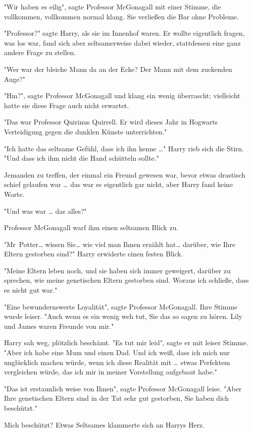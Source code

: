 {"Wir haben es eilig", sagte Professor McGonagall mit einer Stimme, die vollkommen, vollkommen normal klang. Sie verließen die Bar ohne Probleme.

"Professor?" sagte Harry, als sie im Innenhof waren. Er wollte eigentlich fragen, was los war, fand sich aber seltsamerweise dabei wieder, stattdessen eine ganz andere Frage zu stellen.

"Wer war der bleiche Mann da an der Ecke? Der Mann mit dem zuckenden Auge?"

"Hm?", sagte Professor McGonagall und klang ein wenig überrascht; vielleicht hatte sie diese Frage auch nicht erwartet.

"Das war Professor Quirinus Quirrell. Er wird dieses Jahr in Hogwarts Verteidigung gegen die dunklen Künste unterrichten."

"Ich hatte das seltsame Gefühl, dass ich ihn kenne …" Harry rieb sich die Stirn. "Und dass ich ihm nicht die Hand schütteln sollte."

Jemanden zu treffen, der einmal ein Freund gewesen war, bevor etwas drastisch schief gelaufen war … das war es eigentlich gar nicht, aber Harry fand keine Worte.

"Und was war … das alles?"

Professor McGonagall warf ihm einen seltsamen Blick zu.

"Mr~Potter… wissen Sie… wie viel man Ihnen erzählt hat… darüber, wie Ihre Eltern gestorben sind?" Harry erwiderte einen festen Blick.

"Meine Eltern leben noch, und sie haben sich immer geweigert, darüber zu sprechen, wie meine genetischen Eltern gestorben sind. Woraus ich schließe, dass es nicht gut war."

"Eine bewundernswerte Loyalität", sagte Professor McGonagall. Ihre Stimme wurde leiser. "Auch wenn es ein wenig weh tut, Sie das so sagen zu hören. Lily und James waren Freunde von mir."

Harry sah weg, plötzlich beschämt. "Es tut mir leid", sagte er mit leiser Stimme. "Aber ich habe eine Mum und einen Dad. Und ich weiß, dass ich mich nur unglücklich machen würde, wenn ich diese Realität mit … etwas Perfektem vergleichen würde, das ich mir in meiner Vorstellung aufgebaut habe."

"Das ist erstaunlich weise von Ihnen", sagte Professor McGonagall leise. "Aber Ihre genetischen Eltern sind in der Tat sehr gut gestorben, Sie haben dich beschützt."

Mich beschützt? Etwas Seltsames klammerte sich an Harrys Herz.

}

